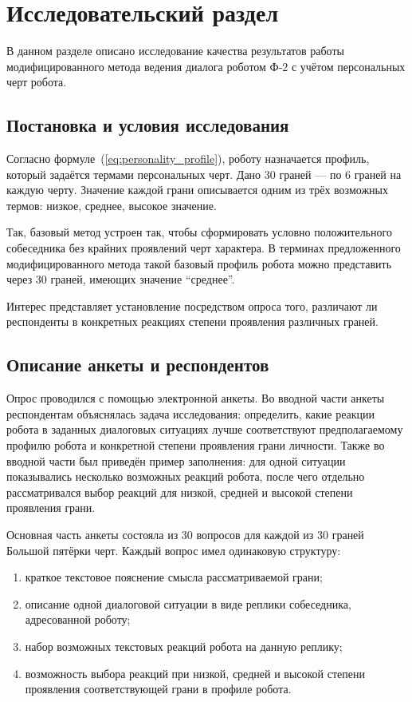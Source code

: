 \chapter{Исследовательский раздел}

В данном разделе описано исследование качества результатов работы
модифицированного метода ведения диалога роботом Ф-2 с учётом персональных
черт робота.

\section{Постановка и условия исследования}

Согласно формуле~(\ref{eq:personality_profile}), роботу назначается профиль, который задаётся термами персональных черт.
Дано 30 граней --- по 6 граней на каждую черту.
Значение каждой грани описывается одним из трёх возможных термов: низкое, среднее, высокое значение.

Так, базовый метод устроен так, чтобы сформировать условно положительного собеседника без крайних проявлений черт характера.
В терминах предложенного модифицированного метода такой базовый профиль робота можно представить через 30 граней, имеющих значение ``среднее''.

Интерес представляет установление посредством опроса того, различают ли респонденты в конкретных реакциях степени проявления различных граней.

\section{Описание анкеты и респондентов}

Опрос проводился с помощью электронной анкеты.
Во вводной части анкеты респондентам объяснялась задача исследования: определить, какие реакции робота в заданных диалоговых ситуациях лучше соответствуют предполагаемому профилю робота и конкретной степени проявления грани личности.
Также во вводной части был приведён пример заполнения: для одной ситуации показывались
несколько возможных реакций робота, после чего отдельно рассматривался выбор
реакций для низкой, средней и высокой степени проявления грани.

Основная часть анкеты состояла из 30 вопросов для каждой из 30 граней Большой пятёрки черт.
Каждый вопрос имел одинаковую структуру:

\begin{enumerate}
	\item краткое текстовое пояснение смысла рассматриваемой грани;
	\item описание одной диалоговой ситуации в виде реплики собеседника,
	адресованной роботу;
	\item набор возможных текстовых реакций робота на данную реплику;
	\item возможность выбора реакций при низкой, средней и высокой степени проявления соответствующей грани в профиле робота.
\end{enumerate}


